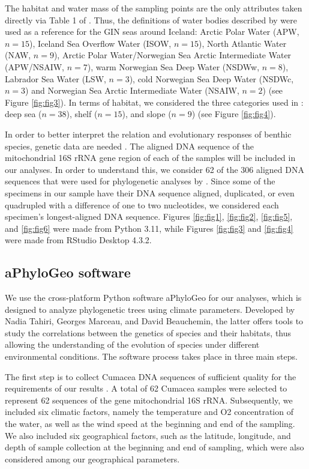 The habitat and water mass of the sampling points are the only attributes taken directly via Table 1 of \citep{uhlir_adding_2021}. Thus, the definitions of water bodies described by \citep{hansen_north_2000,brix2010distribution,ostmann_marine_2014} were used as a reference for the GIN seas around Iceland: Arctic Polar Water (APW, $n=15$), Iceland Sea Overflow Water (ISOW, $n=15$), North Atlantic Water (NAW, $n=9$), Arctic Polar Water/Norwegian Sea Arctic Intermediate Water (APW/NSAIW, $n=7$), warm Norwegian Sea Deep Water (NSDWw, $n=8$), Labrador Sea Water (LSW, $n=3$), cold Norwegian Sea Deep Water (NSDWc, $n=3$) and Norwegian Sea Arctic Intermediate Water (NSAIW, $n=2$) (see Figure \ref{fig:fig3}). In terms of habitat, we considered the three categories used in \citep{uhlir_adding_2021}: deep sea ($n=38$), shelf ($n=15$), and slope ($n=9$) (see Figure \ref{fig:fig4}).

In order to better interpret the relation and evolutionary responses of benthic species, genetic data are needed \citep{wilson_speciation_1987,uhlir_adding_2021}. The aligned DNA sequence of the mitochondrial 16S rRNA gene region of each of the samples will be included in our analyses. In order to understand this, we consider 62 of the 306 aligned DNA sequences that were used for phylogenetic analyses by \citep{uhlir_adding_2021}. Since some of the specimens in our sample have their DNA sequence aligned, duplicated, or even quadrupled with a difference of one to two nucleotides, we considered each specimen's longest-aligned DNA sequence. Figures  \ref{fig:fig1},  \ref{fig:fig2}, \ref{fig:fig5}, and \ref{fig:fig6} were made from Python 3.11, while Figures \ref{fig:fig3} and \ref{fig:fig4} were made from RStudio Desktop 4.3.2.

\subsection{aPhyloGeo software}

We use the cross-platform Python software aPhyloGeo for our analyses, which is designed to analyze phylogenetic trees using climate parameters. Developed by Nadia Tahiri, Georges Marceau, and David Beauchemin, the latter offers tools to study the correlations between the genetics of species and their habitats, thus allowing the understanding of the evolution of species under different environmental conditions. The software process takes place in three main steps. 

    The first step is to collect Cumacea DNA sequences of sufficient quality for the requirements of our results \citep{koshkarov_phylogeography_2022}. A total of 62 Cumacea samples were selected to represent 62 sequences of the gene mitochondrial 16S rRNA. Subsequently, we included six climatic factors, namely the temperature and O2 concentration of the water, as well as the wind speed at the beginning and end of the sampling. We also included six geographical factors, such as the latitude, longitude, and depth of sample collection at the beginning and end of sampling, which were also considered among our geographical parameters.

